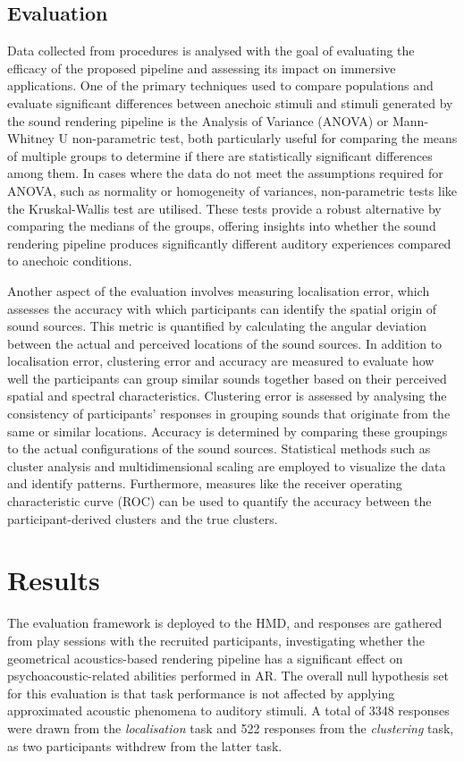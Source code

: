 \subsection{Evaluation}
Data collected from procedures is analysed with the goal of evaluating the efficacy of the proposed pipeline and assessing its impact on immersive applications. One of the primary techniques used to compare populations and evaluate significant differences between anechoic stimuli and stimuli generated by the sound rendering pipeline is the Analysis of Variance (ANOVA) or Mann-Whitney U non-parametric test, both particularly useful for comparing the means of multiple groups to determine if there are statistically significant differences among them. In cases where the data do not meet the assumptions required for ANOVA, such as normality or homogeneity of variances, non-parametric tests like the Kruskal-Wallis test are utilised. These tests provide a robust alternative by comparing the medians of the groups, offering insights into whether the sound rendering pipeline produces significantly different auditory experiences compared to anechoic conditions.\par
Another aspect of the evaluation involves measuring localisation error, which assesses the accuracy with which participants can identify the spatial origin of sound sources. This metric is quantified by calculating the angular deviation between the actual and perceived locations of the sound sources. In addition to localisation error, clustering error and accuracy are measured to evaluate how well the participants can group similar sounds together based on their perceived spatial and spectral characteristics. Clustering error is assessed by analysing the consistency of participants' responses in grouping sounds that originate from the same or similar locations. Accuracy is determined by comparing these groupings to the actual configurations of the sound sources. Statistical methods such as cluster analysis and multidimensional scaling are employed to visualize the data and identify patterns. Furthermore, measures like the receiver operating characteristic curve (ROC) can be used to quantify the accuracy between the participant-derived clusters and the true clusters.

\section{Results}
The evaluation framework is deployed to the HMD, and responses are gathered from play sessions with the recruited participants, investigating whether the geometrical acoustics-based rendering pipeline has a significant effect on psychoacoustic-related abilities performed in AR. The overall null hypothesis set for this evaluation is that task performance is not affected by applying approximated acoustic phenomena to auditory stimuli. A total of 3348 responses were drawn from the \emph{localisation} task and 522 responses from the \emph{clustering} task, as two participants withdrew from the latter task. \par

